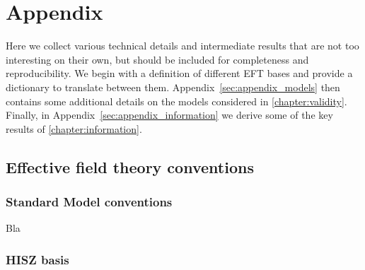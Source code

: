 
\chapter{Appendix}
\label{chapter:appendix}

Here we collect various technical details and intermediate results
that are not too interesting on their own, but should be included for
completeness and reproducibility. We begin with a definition of
different EFT bases and provide a dictionary to translate between
them. Appendix~\ref{sec:appendix_models} then contains some additional
details on the models considered in
\autoref{chapter:validity}. Finally, in
Appendix~\ref{sec:appendix_information} we derive some of the key
results of \autoref{chapter:information}.



\section{Effective field theory conventions}
\label{sec:appendix_bases}




\subsection{Standard Model conventions}
\label{sec:appendix_bases_sm}

Bla


\subsection{HISZ basis}
\label{sec:appendix_bases_hisz}


